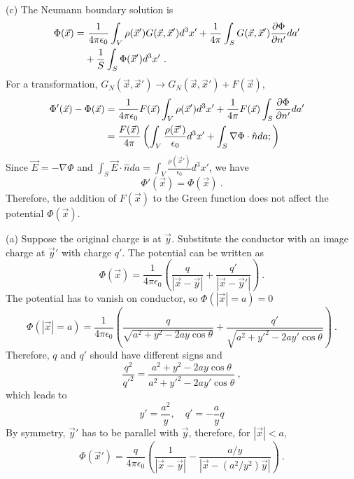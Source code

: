 \documentclass[12pt]{article}
\begin{document}
\newpage
\noindent(c)
The Neumann boundary solution is
\begin{align}
    \Phi(\vec x) = &~ \frac{1}{4\pi \epsilon_0} \int_V \rho(\vec x') G(\vec x, \vec x') d^3x' + \frac{1}{4\pi} \int_S G(\vec x, \vec x') \frac{\partial \Phi}{\partial n'} da' \cr
    &+\frac{1}{S} \int_{S} \Phi(\vec x') d^3 x'~.
\end{align}
For a transformation, $G_N(\vec x, \vec x') \to G_N(\vec x, \vec x') + F(\vec x)$,
\begin{align}
    \Phi'(\vec x) - \Phi(\vec x) &= \frac{1}{4\pi \epsilon_0}  F(\vec x)\int_V \rho(\vec x') d^3 x' + \frac{1}{4\pi} F(\vec x) \int_S \frac{\partial \Phi}{\partial n'} da' \cr
    &= \frac{F(\vec x)}{4\pi} \left( \int_V \frac{\rho(\vec x')}{\epsilon_0}  d^3 x' + \int_S \nabla \Phi \cdot \hat{n} da;\right)
\end{align}
Since $\vec E = - \nabla \Phi$ and $\int_S \vec E \cdot \hat n da = \int_V \frac{\rho(\vec x')}{\epsilon_0} d^3 x'$, we have
\begin{equation}
    \Phi'(\vec x) = \Phi(\vec x)~.
\end{equation}
Therefore, the addition of $F(\vec x)$ to the Green function does not affect the potential $\Phi(\vec x)$.

\newpage
{} (a) Suppose the original charge is at $\vec y$. Substitute the conductor with an image charge at $\vec y'$ with charge $q'$. The potential can be written as
\begin{equation}
\Phi(\vec x) = \frac{1}{4\pi \epsilon_0} \left(\frac{q}{|\vec x - \vec y|} + \frac{q'}{|\vec x - \vec y'|} \right)~.
\end{equation}
The potential has to vanish on conductor, so $\Phi(|\vec x| = a) = 0$
\begin{equation}
    \Phi(|\vec x| = a) = \frac{1}{4\pi \epsilon_0} \left( \frac{q}{\sqrt{a^2 + y^2 - 2ay\cos\theta}} + \frac{q'}{ \sqrt{a^2 + y'^2 -2 ay' \cos \theta}}\right)~.
\end{equation}
Therefore, $q$ and $q'$ should have different signs and
\begin{equation}
    \frac{q^2}{q'^2} = \frac{a^2 + y^2 - 2ay\cos\theta}{a^2 + y'^2 -2 ay' \cos\theta}~,
\end{equation}
which leads to
\begin{equation}
    y' = \frac{a^2}{y}, \quad q' = - \frac{a}{y}q
\end{equation}
By symmetry, $\vec y'$ has to be parallel with $\vec y$, therefore, for $|\vec x| < a$,
\begin{equation}
    \Phi(\vec x') = \frac{q}{4\pi \epsilon_0} \left( \frac{1}{|\vec x - \vec y|} - \frac{a/y}{|\vec x - (a^2/y^2) \vec y|} \right)~.
\end{equation}
\end{document}
